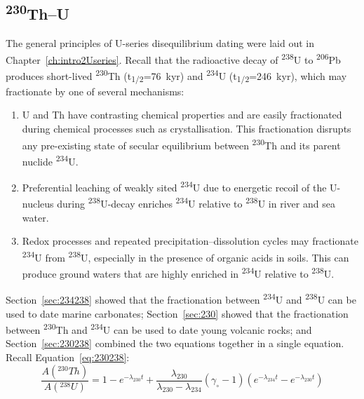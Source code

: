 \begin{refsection}

\chapter{\textsuperscript{230}Th--U}\label{ch:ThU}

The general principles of U-series disequilibrium dating were laid out
in Chapter~\ref{ch:intro2Useries}. Recall that the radioactive decay
of \textsuperscript{238}U to \textsuperscript{206}Pb produces
short-lived \textsuperscript{230}Th (t\textsubscript{1/2}=76~kyr) and
\textsuperscript{234}U (t\textsubscript{1/2}=246~kyr), which may
fractionate by one of several mechanisms:

\begin{enumerate}
\item U and Th have contrasting chemical properties and are easily
  fractionated during chemical processes such as crystallisation. This
  fractionation disrupts any pre-existing state of secular equilibrium
  between \textsuperscript{230}Th and its parent nuclide
  \textsuperscript{234}U.
\item Preferential leaching of weakly sited \textsuperscript{234}U due
  to energetic recoil of the U-nucleus during
  \textsuperscript{238}U-decay enriches \textsuperscript{234}U
  relative to \textsuperscript{238}U in river and sea water.
\item Redox processes and repeated precipitation--dissolution cycles
  may fractionate \textsuperscript{234}U from \textsuperscript{238}U,
  especially in the presence of organic acids in soils. This can
  produce ground waters that are highly enriched in
  \textsuperscript{234}U relative to \textsuperscript{238}U.
\end{enumerate}

Section~\ref{sec:234238} showed that the fractionation between
\textsuperscript{234}U and \textsuperscript{238}U can be used to date
marine carbonates; Section~\ref{sec:230} showed that the fractionation
between \textsuperscript{230}Th and \textsuperscript{234}U can be used
to date young volcanic rocks; and Section~\ref{sec:230238} combined
the two equations together in a single equation. Recall
Equation~\ref{eq:230238}:
\begin{equation*}
  \frac{A(^{230}Th)}{A(^{238}U)} = 1 - e^{-\lambda_{230}t} +
  \frac{\lambda_{230}}{\lambda_{230}-\lambda_{234}} (\gamma_\circ-1)
\left(e^{-\lambda_{234}t}-e^{-\lambda_{230}t}\right)
\end{equation*}


\end{refsection}
